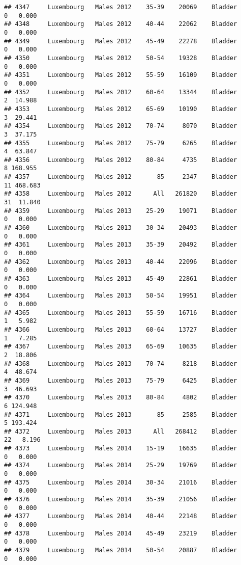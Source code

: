 \documentclass[
]{article}
\begin{document}
\begin{verbatim}
## 4347     Luxembourg   Males 2012    35-39    20069    Bladder      0   0.000
## 4348     Luxembourg   Males 2012    40-44    22062    Bladder      0   0.000
## 4349     Luxembourg   Males 2012    45-49    22278    Bladder      0   0.000
## 4350     Luxembourg   Males 2012    50-54    19328    Bladder      0   0.000
## 4351     Luxembourg   Males 2012    55-59    16109    Bladder      0   0.000
## 4352     Luxembourg   Males 2012    60-64    13344    Bladder      2  14.988
## 4353     Luxembourg   Males 2012    65-69    10190    Bladder      3  29.441
## 4354     Luxembourg   Males 2012    70-74     8070    Bladder      3  37.175
## 4355     Luxembourg   Males 2012    75-79     6265    Bladder      4  63.847
## 4356     Luxembourg   Males 2012    80-84     4735    Bladder      8 168.955
## 4357     Luxembourg   Males 2012       85     2347    Bladder     11 468.683
## 4358     Luxembourg   Males 2012      All   261820    Bladder     31  11.840
## 4359     Luxembourg   Males 2013    25-29    19071    Bladder      0   0.000
## 4360     Luxembourg   Males 2013    30-34    20493    Bladder      0   0.000
## 4361     Luxembourg   Males 2013    35-39    20492    Bladder      0   0.000
## 4362     Luxembourg   Males 2013    40-44    22096    Bladder      0   0.000
## 4363     Luxembourg   Males 2013    45-49    22861    Bladder      0   0.000
## 4364     Luxembourg   Males 2013    50-54    19951    Bladder      0   0.000
## 4365     Luxembourg   Males 2013    55-59    16716    Bladder      1   5.982
## 4366     Luxembourg   Males 2013    60-64    13727    Bladder      1   7.285
## 4367     Luxembourg   Males 2013    65-69    10635    Bladder      2  18.806
## 4368     Luxembourg   Males 2013    70-74     8218    Bladder      4  48.674
## 4369     Luxembourg   Males 2013    75-79     6425    Bladder      3  46.693
## 4370     Luxembourg   Males 2013    80-84     4802    Bladder      6 124.948
## 4371     Luxembourg   Males 2013       85     2585    Bladder      5 193.424
## 4372     Luxembourg   Males 2013      All   268412    Bladder     22   8.196
## 4373     Luxembourg   Males 2014    15-19    16635    Bladder      0   0.000
## 4374     Luxembourg   Males 2014    25-29    19769    Bladder      0   0.000
## 4375     Luxembourg   Males 2014    30-34    21016    Bladder      0   0.000
## 4376     Luxembourg   Males 2014    35-39    21056    Bladder      0   0.000
## 4377     Luxembourg   Males 2014    40-44    22148    Bladder      0   0.000
## 4378     Luxembourg   Males 2014    45-49    23219    Bladder      0   0.000
## 4379     Luxembourg   Males 2014    50-54    20887    Bladder      0   0.000

\end{verbatim}
\end{document}
